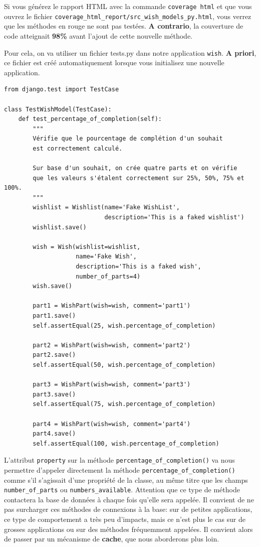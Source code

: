 \documentclass[11pt]{amsbook}
\begin{document}
Si vous générez le rapport HTML avec la commande \texttt{coverage html} et que vous ouvrez le fichier \texttt{coverage\_html\_report/src\_wish\_models\_py.html}, vous verrez que les méthodes en rouge ne sont pas testées.
\textbf{A contrario}, la couverture de code atteignait \textbf{98\%} avant l’ajout de cette nouvelle méthode.


Pour cela, on va utiliser un fichier tests.py dans notre application \texttt{wish}. \textbf{A priori}, ce fichier est créé automatiquement lorsque vous initialisez une nouvelle application.


\begin{verbatim}
from django.test import TestCase

class TestWishModel(TestCase):
    def test_percentage_of_completion(self):
        """
        Vérifie que le pourcentage de complétion d'un souhait
        est correctement calculé.

        Sur base d'un souhait, on crée quatre parts et on vérifie
        que les valeurs s'étalent correctement sur 25%, 50%, 75% et 100%.
        """
        wishlist = Wishlist(name='Fake WishList',
                            description='This is a faked wishlist')
        wishlist.save()

        wish = Wish(wishlist=wishlist,
                    name='Fake Wish',
                    description='This is a faked wish',
                    number_of_parts=4)
        wish.save()

        part1 = WishPart(wish=wish, comment='part1')
        part1.save()
        self.assertEqual(25, wish.percentage_of_completion)

        part2 = WishPart(wish=wish, comment='part2')
        part2.save()
        self.assertEqual(50, wish.percentage_of_completion)

        part3 = WishPart(wish=wish, comment='part3')
        part3.save()
        self.assertEqual(75, wish.percentage_of_completion)

        part4 = WishPart(wish=wish, comment='part4')
        part4.save()
        self.assertEqual(100, wish.percentage_of_completion)
\end{verbatim}

L’attribut \texttt{property} sur la méthode \texttt{percentage\_of\_completion()} va nous permettre d’appeler directement la méthode \texttt{percentage\_of\_completion()} comme s’il s’agissait d’une propriété de la classe, au même titre que les champs \texttt{number\_of\_parts} ou \texttt{numbers\_available}. Attention que ce type de méthode contactera la base de données à chaque fois qu’elle sera appelée. Il convient de ne pas surcharger ces méthodes de connexions à la base: sur de petites applications, ce type de comportement a très peu d’impacts, mais ce n’est plus le cas sur de grosses applications ou sur des méthodes fréquemment appelées. Il convient alors de passer par un mécanisme de \textbf{cache}, que nous aborderons plus loin.
\end{document}
